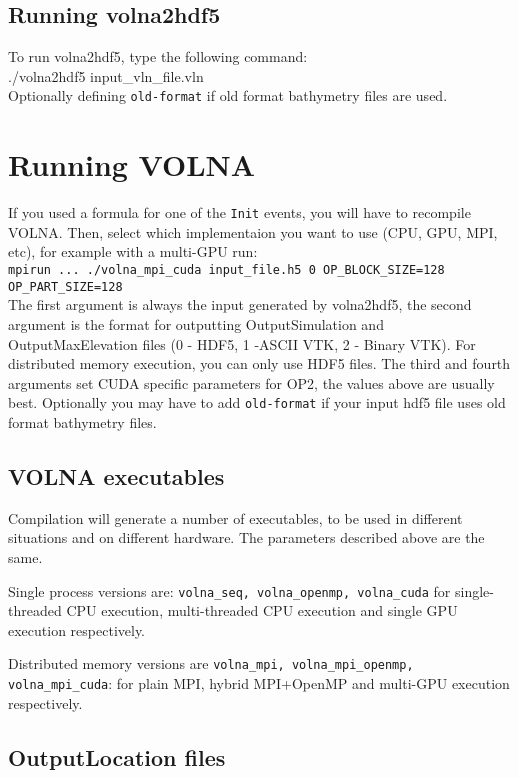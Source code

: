 \documentclass[11pt]{article}
\begin{document}
\subsection{Running volna2hdf5}
To run volna2hdf5, type the following command:\\
{\centering ./volna2hdf5 input\_vln\_file.vln}\\
Optionally defining \texttt{old-format} if old format bathymetry files are used.

\section{Running VOLNA} \label{sec/running}
If you used a formula for one of the \texttt{Init} events, you will have to recompile VOLNA. Then, select which implementaion you want to use (CPU, GPU, MPI, etc), for example with a multi-GPU run:\\
{\tt mpirun ... ./volna\_mpi\_cuda input\_file.h5 0 OP\_BLOCK\_SIZE=128 OP\_PART\_SIZE=128}\\
The first argument is always the input generated by volna2hdf5, the second argument is the format for outputting OutputSimulation and OutputMaxElevation files (0 - HDF5, 1 -ASCII VTK, 2 - Binary VTK). For distributed memory execution, you can only use HDF5 files. The third and fourth arguments set CUDA specific parameters for OP2, the values above are usually best. Optionally you may have to add \texttt{old-format} if your input hdf5 file uses old format bathymetry files.

\subsection{VOLNA executables}
Compilation will generate a number of executables, to be used in different situations and on different hardware. The parameters described above are the same.

Single process versions are: \texttt{volna\_seq, volna\_openmp, volna\_cuda} for single-threaded CPU execution, multi-threaded CPU execution and single GPU execution respectively.

Distributed memory versions are \texttt{volna\_mpi, volna\_mpi\_openmp, volna\_mpi\_cuda}: for plain MPI, hybrid MPI+OpenMP and multi-GPU execution respectively.


\subsection{OutputLocation files}\label{sec/location}
\end{document}
